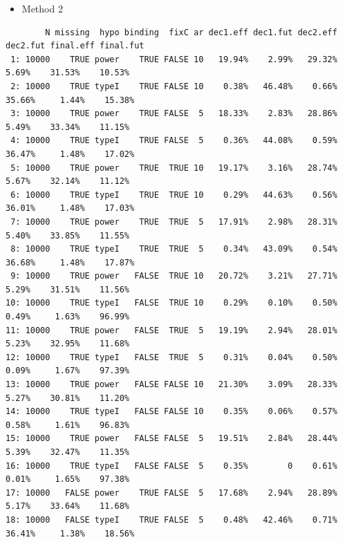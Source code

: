 \documentclass[12pt]{article}
\begin{document}
\begin{itemize}
\item Method 2
\end{itemize}
\begin{verbatim}
        N missing  hypo binding  fixC ar dec1.eff dec1.fut dec2.eff dec2.fut final.eff final.fut
 1: 10000    TRUE power    TRUE FALSE 10   19.94%    2.99%   29.32%    5.69%    31.53%    10.53%
 2: 10000    TRUE typeI    TRUE FALSE 10    0.38%   46.48%    0.66%   35.66%     1.44%    15.38%
 3: 10000    TRUE power    TRUE FALSE  5   18.33%    2.83%   28.86%    5.49%    33.34%    11.15%
 4: 10000    TRUE typeI    TRUE FALSE  5    0.36%   44.08%    0.59%   36.47%     1.48%    17.02%
 5: 10000    TRUE power    TRUE  TRUE 10   19.17%    3.16%   28.74%    5.67%    32.14%    11.12%
 6: 10000    TRUE typeI    TRUE  TRUE 10    0.29%   44.63%    0.56%   36.01%     1.48%    17.03%
 7: 10000    TRUE power    TRUE  TRUE  5   17.91%    2.98%   28.31%    5.40%    33.85%    11.55%
 8: 10000    TRUE typeI    TRUE  TRUE  5    0.34%   43.09%    0.54%   36.68%     1.48%    17.87%
 9: 10000    TRUE power   FALSE  TRUE 10   20.72%    3.21%   27.71%    5.29%    31.51%    11.56%
10: 10000    TRUE typeI   FALSE  TRUE 10    0.29%    0.10%    0.50%    0.49%     1.63%    96.99%
11: 10000    TRUE power   FALSE  TRUE  5   19.19%    2.94%   28.01%    5.23%    32.95%    11.68%
12: 10000    TRUE typeI   FALSE  TRUE  5    0.31%    0.04%    0.50%    0.09%     1.67%    97.39%
13: 10000    TRUE power   FALSE FALSE 10   21.30%    3.09%   28.33%    5.27%    30.81%    11.20%
14: 10000    TRUE typeI   FALSE FALSE 10    0.35%    0.06%    0.57%    0.58%     1.61%    96.83%
15: 10000    TRUE power   FALSE FALSE  5   19.51%    2.84%   28.44%    5.39%    32.47%    11.35%
16: 10000    TRUE typeI   FALSE FALSE  5    0.35%        0    0.61%    0.01%     1.65%    97.38%
17: 10000   FALSE power    TRUE FALSE  5   17.68%    2.94%   28.89%    5.17%    33.64%    11.68%
18: 10000   FALSE typeI    TRUE FALSE  5    0.48%   42.46%    0.71%   36.41%     1.38%    18.56%
\end{verbatim}

\clearpage
\end{document}
